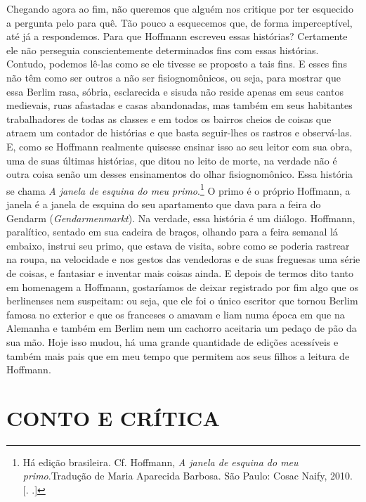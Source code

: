 Chegando agora ao fim, não queremos que alguém nos critique por ter
esquecido a pergunta pelo para quê. Tão pouco a esquecemos que, de forma
imperceptível, até já a respondemos. Para que Hoffmann escreveu essas
histórias? Certamente ele não perseguia conscientemente determinados
fins com essas histórias. Contudo, podemos lê-las como se ele tivesse se
proposto a tais fins. E esses fins não têm como ser outros a não ser
fisiognomônicos, ou seja, para mostrar que essa Berlim rasa, sóbria,
esclarecida e sisuda não reside apenas em seus cantos medievais, ruas
afastadas e casas abandonadas, mas também em seus habitantes
trabalhadores de todas as classes e em todos os bairros cheios de coisas
que atraem um contador de histórias e que basta seguir-lhes os rastros e
observá-las. E, como se Hoffmann realmente quisesse ensinar isso ao seu
leitor com sua obra, uma de suas últimas histórias, que ditou no leito
de morte, na verdade não é outra coisa senão um desses ensinamentos do
olhar fisiognomônico. Essa história se chama \emph{A janela de esquina
do meu primo}.\footnote{Há edição brasileira. Cf.  Hoffmann,
  \emph{A janela de esquina do meu primo}.Tradução de Maria Aparecida
  Barbosa. São Paulo: Cosac Naify, 2010. [. .]} O
primo é o próprio Hoffmann, a janela é a janela de esquina do seu
apartamento que dava para a feira do Gendarm (\emph{Gendarmenmarkt}). Na
verdade, essa história é um diálogo. Hoffmann, paralítico, sentado em
sua cadeira de braços, olhando para a feira semanal lá embaixo, instrui
seu primo, que estava de visita, sobre como se poderia rastrear na
roupa, na velocidade e nos gestos das vendedoras e de suas freguesas uma
série de coisas, e fantasiar e inventar mais coisas ainda. E depois de
termos dito tanto em homenagem a Hoffmann, gostaríamos de deixar
registrado por fim algo que os berlinenses nem suspeitam: ou seja, que
ele foi o único escritor que tornou Berlim famosa no exterior e que os
franceses o amavam e liam numa época em que na Alemanha e também em
Berlim nem um cachorro aceitaria um pedaço de pão da sua mão. Hoje isso
mudou, há uma grande quantidade de edições acessíveis e também mais pais
que em meu tempo que permitem aos seus filhos a leitura de Hoffmann.

\part{CONTO E CRÍTICA}


